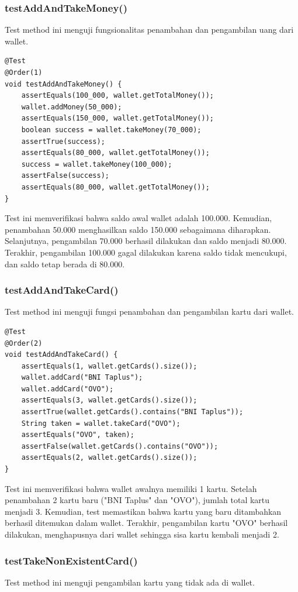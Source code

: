 \documentclass[a4paper,oneside,11pt]{book}
\begin{document}
\subsubsection{testAddAndTakeMoney()}
Test method ini menguji fungsionalitas penambahan dan pengambilan uang dari wallet.

\begin{lstlisting}[style=javastyle]
@Test
@Order(1)
void testAddAndTakeMoney() {
    assertEquals(100_000, wallet.getTotalMoney());
    wallet.addMoney(50_000);
    assertEquals(150_000, wallet.getTotalMoney());
    boolean success = wallet.takeMoney(70_000);
    assertTrue(success);
    assertEquals(80_000, wallet.getTotalMoney());
    success = wallet.takeMoney(100_000);
    assertFalse(success);
    assertEquals(80_000, wallet.getTotalMoney());
}
\end{lstlisting}

Test ini memverifikasi bahwa saldo awal wallet adalah 100.000. Kemudian, penambahan 50.000 menghasilkan saldo 150.000 sebagaimana diharapkan. Selanjutnya, pengambilan 70.000 berhasil dilakukan dan saldo menjadi 80.000. Terakhir, pengambilan 100.000 gagal dilakukan karena saldo tidak mencukupi, dan saldo tetap berada di 80.000.

\subsubsection{testAddAndTakeCard()}
Test method ini menguji fungsi penambahan dan pengambilan kartu dari wallet.

\begin{lstlisting}[style=javastyle]
@Test
@Order(2)
void testAddAndTakeCard() {
    assertEquals(1, wallet.getCards().size());
    wallet.addCard("BNI Taplus");
    wallet.addCard("OVO");
    assertEquals(3, wallet.getCards().size());
    assertTrue(wallet.getCards().contains("BNI Taplus"));
    String taken = wallet.takeCard("OVO");
    assertEquals("OVO", taken);
    assertFalse(wallet.getCards().contains("OVO"));
    assertEquals(2, wallet.getCards().size());
}
\end{lstlisting}

Test ini memverifikasi bahwa wallet awalnya memiliki 1 kartu. Setelah penambahan 2 kartu baru ("BNI Taplus" dan "OVO"), jumlah total kartu menjadi 3. Kemudian, test memastikan bahwa kartu yang baru ditambahkan berhasil ditemukan dalam wallet. Terakhir, pengambilan kartu "OVO" berhasil dilakukan, menghapusnya dari wallet sehingga sisa kartu kembali menjadi 2.
\newpage
\subsubsection{testTakeNonExistentCard()}
Test method ini menguji pengambilan kartu yang tidak ada di wallet.
\end{document}
